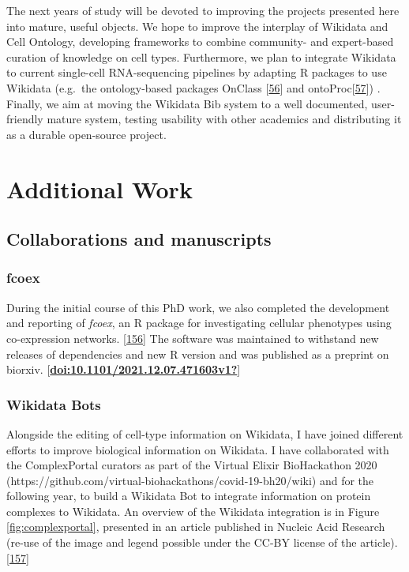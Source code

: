 The next years of study will be devoted to improving the projects presented here into mature, useful objects.
We hope to improve the interplay of Wikidata and Cell Ontology, developing frameworks to combine community- and expert-based curation of knowledge on cell types.
Furthermore, we plan to integrate Wikidata to current single-cell RNA-sequencing pipelines by adapting R packages to use Wikidata (e.g.~the ontology-based packages OnClass {[}\protect\hyperlink{ref-sW6aNZJB}{56}{]} and ontoProc{[}\protect\hyperlink{ref-15YmDXALp}{57}{]}) .
Finally, we aim at moving the Wikidata Bib system to a well documented, user-friendly mature system, testing usability with other academics and distributing it as a durable open-source project.

\hypertarget{additional-work}{%
\section{Additional Work}\label{additional-work}}

\hypertarget{collaborations-and-manuscripts}{%
\subsection{Collaborations and manuscripts}\label{collaborations-and-manuscripts}}

\hypertarget{fcoex}{%
\subsubsection{fcoex}\label{fcoex}}

During the initial course of this PhD work, we also completed the development and reporting of \emph{fcoex}, an R package for investigating cellular phenotypes using co-expression networks. {[}\protect\hyperlink{ref-MxIeSJYt}{156}{]} The software was maintained to withstand new releases of dependencies and new R version and was published as a preprint on biorxiv. {[}\protect\hyperlink{ref-doi:10.1101ux2f2021.12.07.471603v1}{\textbf{doi:10.1101/2021.12.07.471603v1?}}{]}

\hypertarget{wikidata-bots}{%
\subsubsection{Wikidata Bots}\label{wikidata-bots}}

Alongside the editing of cell-type information on Wikidata, I have joined different efforts to improve biological information on Wikidata.
I have collaborated with the ComplexPortal curators as part of the Virtual Elixir BioHackathon 2020 (https://github.com/virtual-biohackathons/covid-19-bh20/wiki) and for the following year, to build a Wikidata Bot to integrate information on protein complexes to Wikidata. An overview of the Wikidata integration is in Figure \ref{fig:complexportal}, presented in an article published in Nucleic Acid Research (re-use of the image and legend possible under the CC-BY license of the article). {[}\protect\hyperlink{ref-CQRJ53gu}{157}{]}

